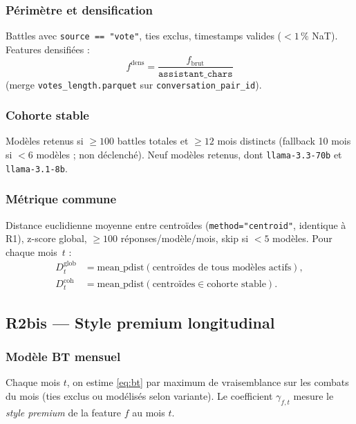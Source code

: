 \documentclass[11pt,a4paper]{article}
\begin{document}
\subsubsection{Périmètre et densification}

Battles avec \texttt{source == "vote"}, ties exclus, timestamps valides
($<1\,\%$ NaT). Features densifiées :
\begin{equation}
  f^{\mathrm{dens}} = \frac{f_{\mathrm{brut}}}{\texttt{assistant\_chars}}
\end{equation}
(merge \texttt{votes\_length.parquet} sur \texttt{conversation\_pair\_id}).

\subsubsection{Cohorte stable}

Modèles retenus si $\geq 100$ battles totales et $\geq 12$ mois distincts
(fallback 10 mois si $<6$ modèles ; non déclenché). Neuf modèles retenus,
dont \texttt{llama-3.3-70b} et \texttt{llama-3.1-8b}.

\subsubsection{Métrique commune}

Distance euclidienne moyenne entre centroïdes (\texttt{method="centroid"},
identique à R1), z-score global, $\geq 100$ réponses/modèle/mois, skip si
$<5$ modèles. Pour chaque mois~$t$ :
\begin{align}
  D^{\mathrm{glob}}_t &= \mathrm{mean\_pdist}(\text{centroïdes de tous modèles actifs}), \\
  D^{\mathrm{coh}}_t &= \mathrm{mean\_pdist}(\text{centroïdes} \in \text{cohorte stable}).
\end{align}

\subsection{R2bis --- Style premium longitudinal}

\subsubsection{Modèle BT mensuel}

Chaque mois $t$, on estime \eqref{eq:bt} par maximum de vraisemblance sur les
combats du mois (ties exclus ou modélisés selon variante). Le coefficient
$\gamma_{f,t}$ mesure le \emph{style premium} de la feature $f$ au mois $t$.
\end{document}
